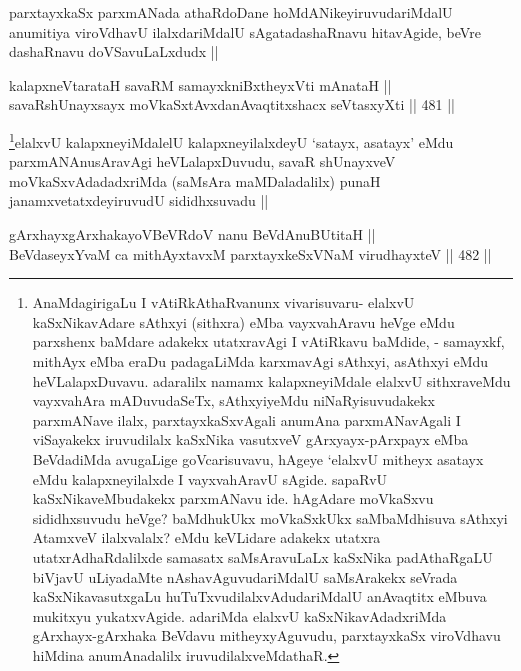 \begin{artha}
parxtayxkaSx parxmANada athaRdoDane hoMdANikeyiruvudariMdalU anumitiya viroVdhavU ilalxdariMdalU sAgatadashaRnavu hitavAgide, beVre dashaRnavu doVSavuLaLxdudx ||
\end{artha}


\begin{shl}
kalapxneVtarataH savaRM samayxkniBxtheyxVti mAnataH || \\
savaRshUnayxsayx moVkaSxtAvxdanAvaqtitxshacx seVtasxyXti ||  481 ||  
\end{shl}

\begin{artha}
\footnote{AnaMdagirigaLu I vAtiRkAthaRvanunx vivarisuvaru- elalxvU kaSxNikavAdare sAthxyi (sithxra) eMba vayxvahAravu heVge eMdu parxshenx baMdare adakekx utatxravAgi I vAtiRkavu baMdide, - samayxkf, mithAyx eMba eraDu padagaLiMda karxmavAgi sAthxyi, asAthxyi eMdu heVLalapxDuvavu. adaralilx namamx kalapxneyiMdale elalxvU sithxraveMdu vayxvahAra mADuvudaSeTx, sAthxyiyeMdu niNaRyisuvudakekx parxmANave ilalx, parxtayxkaSxvAgali anumAna parxmANavAgali I viSayakekx iruvudilalx kaSxNika vasutxveV gArxyayx-pArxpayx eMba BeVdadiMda avugaLige goVcarisuvavu, hAgeye `elalxvU mitheyx asatayx eMdu kalapxneyilalxde I vayxvahAravU sAgide. sapaRvU kaSxNikaveMbudakekx parxmANavu ide. hAgAdare moVkaSxvu sididhxsuvudu heVge? baMdhukUkx moVkaSxkUkx saMbaMdhisuva sAthxyi AtamxveV ilalxvalalx? eMdu keVLidare adakekx utatxra utatxrAdhaRdalilxde samasatx saMsAravuLaLx kaSxNika padAthaRgaLU biVjavU uLiyadaMte nAshavAguvudariMdalU saMsArakekx seVrada kaSxNikavasutxgaLu huTuTxvudilalxvAdudariMdalU anAvaqtitx eMbuva mukitxyu yukatxvAgide. adariMda elalxvU kaSxNikavAdadxriMda gArxhayx-gArxhaka BeVdavu mitheyxyAguvudu, parxtayxkaSx viroVdhavu hiMdina anumAnadalilx iruvudilalxveMdathaR.}elalxvU kalapxneyiMdalelU kalapxneyilalxdeyU `satayx, asatayx' eMdu parxmANAnusAravAgi heVLalapxDuvudu, savaR shUnayxveV moVkaSxvAdadadxriMda (saMsAra maMDaladalilx) punaH janamxvetatxdeyiruvudU sididhxsuvadu ||
\end{artha}


\begin{shl}
gArxhayxgArxhakayoVBeVRdoV nanu BeVdAnuBUtitaH || \\
BeVdaseyxYvaM ca mithAyxtavxM parxtayxkeSxVNaM virudhayxteV ||  482 ||  
\end{shl}

